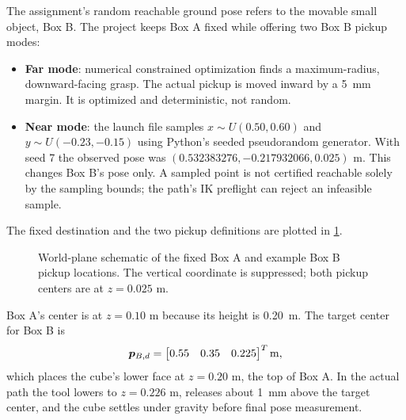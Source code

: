 The assignment's random reachable ground pose refers to the movable small
object, Box B. The project keeps Box A fixed while offering two Box B pickup
modes:
\begin{itemize}
  \item \textbf{Far mode}: numerical constrained optimization finds a
  maximum-radius, downward-facing grasp. The actual pickup is moved inward by
  a \SI{5}{mm} margin. It is optimized and deterministic, not random.
  \item \textbf{Near mode}: the launch file samples $x\sim U(0.50,0.60)$ and
  $y\sim U(-0.23,-0.15)$ using Python's seeded pseudorandom generator. With
  seed 7 the observed pose was $(0.532383276,-0.217932066,0.025)$ m. This
  changes Box B's pose only. A sampled point is not certified reachable solely
  by the sampling bounds; the path's IK preflight can reject an infeasible
  sample.
\end{itemize}
The fixed destination and the two pickup definitions are plotted in
\cref{fig:scene}.

\begin{figure}[htbp]
  \centering
  
  \caption{World-plane schematic of the fixed Box A and example Box B pickup
  locations. The vertical coordinate is suppressed; both pickup centers are
  at $z=0.025$ m.}
  \label{fig:scene}
\end{figure}

Box A's center is at $z=0.10$ m because its height is \SI{0.20}{m}. The target
center for Box B is
\begin{equation}
 \pvec_{B,d}=\begin{bmatrix}0.55&0.35&0.225\end{bmatrix}^{T}\si{m},
 \label{eq:place-target}
\end{equation}
which places the cube's lower face at $z=0.20$ m, the top of Box A. In the
actual path the tool lowers to $z=0.226$ m, releases about \SI{1}{mm} above
the target center, and the cube settles under gravity before final pose
measurement.

